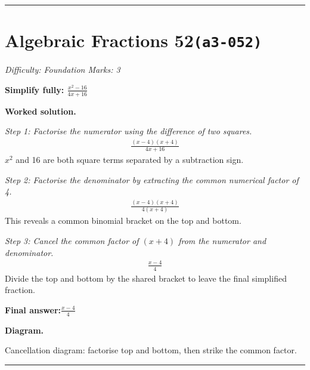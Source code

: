 \documentclass[11pt]{article}
\newcommand{\question}[1]{\par\medskip\noindent\textbf{#1}\par}
\begin{document}
\medskip\hrule

\section*{Algebraic Fractions 52\quad\small\texttt{(a3-052)}}
\textit{Difficulty: Foundation \quad\textbar\quad Marks: 3}

\question{Simplify fully: \( \frac{x^2 - 16}{4x + 16} \)}

\textbf{Worked solution.}

\textit{Step 1: Factorise the numerator using the difference of two squares.}
\[\begin{gathered}
\frac{(x-4)(x+4)}{4x + 16}
\end{gathered}\]
\( x^2 \) and 16 are both square terms separated by a subtraction sign.

\textit{Step 2: Factorise the denominator by extracting the common numerical factor of 4.}
\[\begin{gathered}
\frac{(x-4)(x+4)}{4(x+4)}
\end{gathered}\]
This reveals a common binomial bracket on the top and bottom.

\textit{Step 3: Cancel the common factor of \( (x+4) \) from the numerator and denominator.}
\[\begin{gathered}
\frac{x-4}{4}
\end{gathered}\]
Divide the top and bottom by the shared bracket to leave the final simplified fraction.

\begin{answerbox}
\textbf{Final answer:}\quad \(\displaystyle \frac{x-4}{4}\)
\end{answerbox}
\textbf{Diagram.}

\begin{center}
\end{center}
\small Cancellation diagram: factorise top and bottom, then strike the common factor.\normalsize

\medskip\hrule
\end{document}
